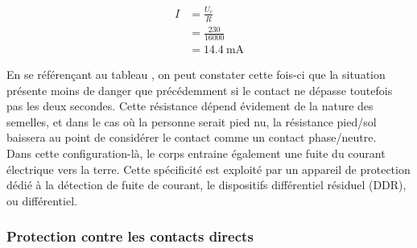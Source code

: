 \begin{align*}
I 	&= \frac{U_c}{R} \\
	&= \frac{230}{16000} \\
	&= \SI{14,4}{\milli\ampere}
\end{align*}

En se référençant au tableau , on peut constater cette fois-ci que la situation présente moins de danger que précédemment si le contact ne dépasse toutefois pas les deux secondes. Cette résistance dépend évidement de la nature des semelles, et dans le cas où la personne serait pied nu, la résistance pied/sol baissera au point de considérer le contact comme un contact phase/neutre.\\

Dans cette configuration-là, le corps entraine également une fuite du courant électrique vers la terre. Cette spécificité est exploité par un appareil de protection dédié à la détection de fuite de courant, le dispositifs différentiel résiduel (DDR), ou différentiel.

\subsubsection{Protection contre les contacts directs}

